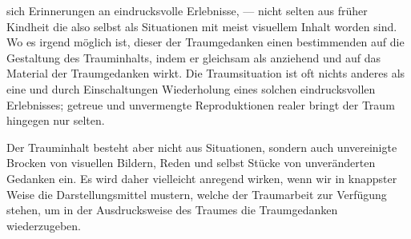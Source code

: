 \documentclass[twoside=true,titlepage=false,open=any, parskip=never, fontsize=10pt, headings=small, chapterprefix=false, appendixprefix=false]{scrbook}
\begin{document}
        \pstart
        sich  Erinnerungen an eindrucksvolle Erlebnisse, — nicht selten aus früher
               Kindheit  die also selbst als Situationen mit meist visuellem Inhalt  worden sind. Wo es irgend möglich ist,  dieser  der Traumgedanken einen bestimmenden  auf die Gestaltung des Trauminhalts, indem er gleichsam als  anziehend und  auf das Material der Traumgedanken wirkt. Die Traumsituation
               ist oft nichts anderes als eine  und durch Einschaltungen  Wiederholung eines solchen eindrucksvollen Erlebnisses;
               getreue und unvermengte Reproduktionen realer
                bringt der Traum hingegen nur  selten.
        \pend
    
            
        \pstart
        Der Trauminhalt besteht aber nicht  aus Situationen, sondern  auch unvereinigte Brocken von visuellen Bildern, Reden und selbst Stücke
               von unveränderten Gedanken ein. Es wird daher vielleicht anregend wirken,
               wenn wir in knappster Weise die Darstellungsmittel mustern, welche der
               Traumarbeit zur Verfügung stehen, um in der
                Ausdrucksweise des Traumes die Traumgedanken wiederzugeben.
        \pend
    
\end{document}
